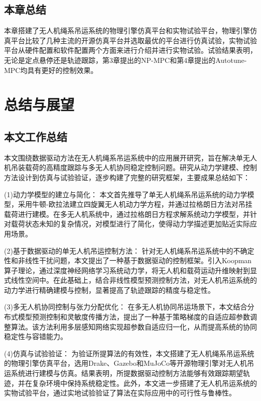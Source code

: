 \documentclass[lang=chs, degree=master, blindreview=true, winfonts=true]{yanputhesis}
\begin{document}
\section{本章总结}
本章搭建了无人机绳系吊运系统的物理引擎仿真平台和实物试验平台，物理引擎仿真平台比较了几种主流的开源仿真平台并选取最优的平台进行仿真试验，实物试验平台从硬件配置和软件配置两个方面来进行介绍并进行实物试验。试验结果表明，无论是定点悬停还是轨迹跟踪，第3章提出的NP-MPC和第4章提出的Autotune-MPC均具有更好的控制效果。


\chapter{总结与展望}


\section{本文工作总结}
本文围绕数据驱动方法在无人机绳系吊运系统中的应用展开研究，旨在解决单无人机吊装载荷的高精度跟踪与多无人机协同稳定控制问题。研究从动力学建模、控制方法设计到仿真与试验验证，逐步构建了完整的研究框架，主要成果总结如下：

(1)动力学模型的建立与简化：
本文首先推导了单无人机绳系吊运系统的动力学模型，采用牛顿-欧拉法建立四旋翼无人机动力学方程，并通过拉格朗日方法对吊挂载荷进行建模。在多无人机系统中，通过拉格朗日方程求解系统动力学模型，并针对载荷状态未知的复杂情况，对模型进行了简化，使得动力学描述更加贴近实际应用场景。

(2)基于数据驱动的单无人机吊运控制方法：
针对无人机绳系吊运系统中的不确定性和非线性干扰问题，本文提出了一种基于数据驱动的控制框架。引入Koopman算子理论，通过深度神经网络学习系统动力学，将无人机和载荷运动升维映射到显式线性空间中。在此基础上，结合非线性模型预测控制方法，对无人机吊运系统的动力学进行精确建模与控制，显著提高了轨迹跟踪的精度与稳定性。

(3)多无人机协同控制与张力分配优化：
在多无人机协同吊运场景下，本文结合分布式模型预测控制和灵敏度传播方法，提出了一种基于策略梯度的自适应超参数调整算法。该方法利用多层感知网络实现超参数自适应归一化，从而提高系统的协同稳定性与容错能力。

(4)仿真与试验验证：
为验证所提算法的有效性，本文搭建了无人机绳系吊运系统的物理引擎仿真平台，选用Drake、Gazebo和MuJoCo等开源物理引擎对无人机吊运系统进行建模与仿真。结果表明，所提数据驱动控制方法能够有效跟踪期望轨迹，并在复杂环境中保持系统稳定性。此外，本文进一步搭建了无人机吊运系统的实物试验平台，通过实地试验验证了算法在实际应用中的可行性与鲁棒性。
\end{document}
